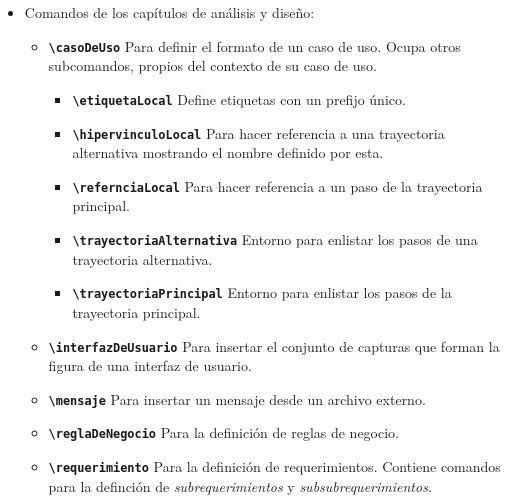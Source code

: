 \begin{itemize}
  \item Comandos de los capítulos de análisis y diseño:

    \begin{itemize}

      \item \textbf{\texttt{{\textbackslash}casoDeUso}}
        Para definir el formato de un caso de uso. Ocupa otros subcomandos,
        propios del contexto de su caso de uso.

        \begin{itemize}

          \item \textbf{\texttt{{\textbackslash}etiquetaLocal}}
            Define etiquetas con un prefijo único.

          \item \textbf{\texttt{{\textbackslash}hipervinculoLocal}}
            Para hacer referencia a una trayectoria alternativa mostrando
            el nombre definido por esta.

          \item \textbf{\texttt{{\textbackslash}refernciaLocal}}
            Para hacer referencia a un paso de la trayectoria principal.

          \item \textbf{\texttt{{\textbackslash}trayectoriaAlternativa}}
            Entorno para enlistar los pasos de una trayectoria
            alternativa.

          \item \textbf{\texttt{{\textbackslash}trayectoriaPrincipal}}
            Entorno para enlistar los pasos de la trayectoria
            principal.

        \end{itemize}

      \item \textbf{\texttt{{\textbackslash}interfazDeUsuario}}
        Para insertar el conjunto de capturas que forman la figura de una
        interfaz de usuario.

      \item \textbf{\texttt{{\textbackslash}mensaje}}
        Para insertar un mensaje desde un archivo externo.

      \item \textbf{\texttt{{\textbackslash}reglaDeNegocio}}
        Para la definición de reglas de negocio.

      \item \textbf{\texttt{{\textbackslash}requerimiento}}
        Para la definición de requerimientos. Contiene comandos para la
        definción de \textit{subrequerimientos} y \textit{subsubrequerimientos}.

    \end{itemize}

\end{itemize}

